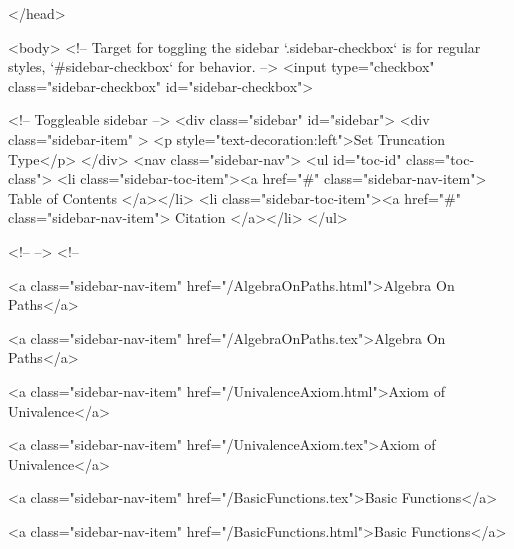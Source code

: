   
</head>




  <body>
    <!-- Target for toggling the sidebar `.sidebar-checkbox` is for regular
     styles, `#sidebar-checkbox` for behavior. -->
<input type="checkbox" class="sidebar-checkbox" id="sidebar-checkbox">

<!-- Toggleable sidebar -->
<div class="sidebar" id="sidebar">
  <div class="sidebar-item" >
    <p style="text-decoration:left">Set Truncation Type</p>
  </div>
  <nav class="sidebar-nav">
    <ul id="toc-id" class="toc-class">
  <li class="sidebar-toc-item"><a href="#" class="sidebar-nav-item"> Table of Contents </a></li>
  <li class="sidebar-toc-item"><a href="#" class="sidebar-nav-item"> Citation </a></li>
</ul>


    <!--  -->
    <!-- 
      
    
      
    
      
    
      
        
      
    
      
        
          <a class="sidebar-nav-item" href="/AlgebraOnPaths.html">Algebra On Paths</a>
        
      
    
      
        
          <a class="sidebar-nav-item" href="/AlgebraOnPaths.tex">Algebra On Paths</a>
        
      
    
      
        
          <a class="sidebar-nav-item" href="/UnivalenceAxiom.html">Axiom of Univalence</a>
        
      
    
      
        
          <a class="sidebar-nav-item" href="/UnivalenceAxiom.tex">Axiom of Univalence</a>
        
      
    
      
        
          <a class="sidebar-nav-item" href="/BasicFunctions.tex">Basic Functions</a>
        
      
    
      
        
          <a class="sidebar-nav-item" href="/BasicFunctions.html">Basic Functions</a>
        
      
    
      
        
